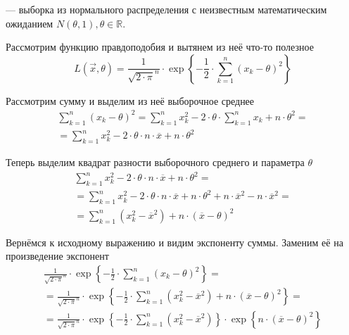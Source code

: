 \begin{example}
  \xsample --- выборка из нормального распределения с неизвестным
  математическим ожиданием $N\left( \theta, 1 \right), \theta \in \mathbb{R}$.

  Рассмотрим функцию правдоподобия и вытянем из неё что-то полезное
  $$L\left( \vec{x}, \theta \right)
      = \frac{1}{\sqrt{2 \cdot \pi}^n}
      \cdot \exp{\left\{ -\frac{1}{2}
      \cdot \sum_{k=1}^n \left( x_k - \theta \right)^2 \right\}}$$

  Рассмотрим сумму и выделим из неё выборочное среднее
  \begin{align*}
      \sum_{k=1}^n \left( x_k - \theta \right)^2
      = \sum_{k=1}^n x_k^2 - 2 \cdot \theta \cdot \sum_{k=1}^n x_k
      + n \cdot \theta^2 = \\
      = \sum_{k=1}^n x_k^2 - 2 \cdot \theta \cdot n \cdot \overline{x}
      + n \cdot \theta^2
  \end{align*}

  Теперь выделим квадрат разности выборочного среднего и параметра $\theta$
  \begin{align*}
      \sum_{k=1}^n x_k^2 - 2 \cdot \theta \cdot n \cdot \overline{x}
      + n \cdot \theta^2 = \\
      = \sum_{k=1}^n x_k^2 - 2 \cdot \theta \cdot n \cdot \overline{x}
      + n \cdot \theta^2 + n \cdot \overline{x}^2
      - n \cdot \overline{x}^2 = \\
      = \sum_{k=1}^n \left( x_k^2 - \overline{x}^2 \right)
      + n \cdot \left( \overline{x} - \theta \right)^2
  \end{align*}

  Вернёмся к исходному выражению и видим экспоненту суммы.
  Заменим её на произведение экспонент
  \begin{align*}
      \frac{1}{\sqrt{2 \cdot \pi}^n} \cdot \exp{\left\{ -\frac{1}{2}
      \cdot \sum_{k=1}^n \left( x_k - \theta \right)^2 \right\}} = \\
      = \frac{1}{\sqrt{2 \cdot \pi}^n} \cdot \exp{\left\{ -\frac{1}{2}
      \cdot \sum_{k=1}^n \left( x_k^2 - \overline{x}^2 \right)
    + n \cdot \left( \overline{x} - \theta \right)^2
    \right\}} = \\
      = \frac{1}{\sqrt{2 \cdot \pi}^n}
      \cdot \exp{\left\{ -\frac{1}{2}
    \cdot \sum_{k=1}^n \left( x_k^2 - \overline{x}^2 \right)
        \right\}}
      \cdot \exp{\left\{ n \cdot \left( \overline{x}
    - \theta \right)^2 \right\}}
  \end{align*}


\end{example}
